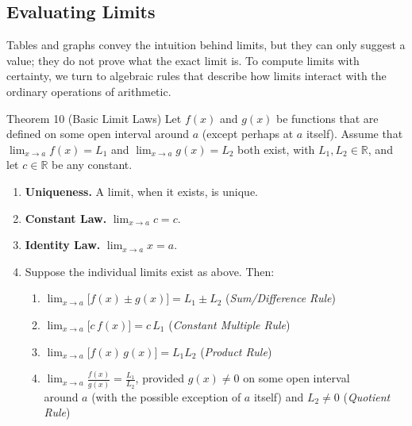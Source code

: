 \subsection*{Evaluating Limits}
\label{subsec:1.1.2}


Tables and graphs convey the intuition behind limits, but they can only suggest a value; they do not prove what the exact limit is.  To compute limits with certainty, we turn to algebraic rules that describe how limits interact with the ordinary operations of arithmetic.

\begin{theorembox}{Theorem 10 (Basic Limit Laws)}
Let \(f(x)\) and \(g(x)\) be functions that are defined on some open interval around \(a\) (except perhaps at \(a\) itself).  Assume that \(\displaystyle\lim_{x \to a} f(x) = L_{1}\) and \(\displaystyle\lim_{x \to a} g(x) = L_{2}\) both exist, with \(L_{1}, L_{2} \in \mathbb{R}\), and let \(c \in \mathbb{R}\) be any constant.

\begin{enumerate}
    \item \textbf{Uniqueness.} A limit, when it exists, is unique.

    \item \textbf{Constant Law.} \(\displaystyle\lim_{x \to a} c = c\).

    \item \textbf{Identity Law.} \(\displaystyle\lim_{x \to a} x = a\).

    \item Suppose the individual limits exist as above. Then:
    \begin{enumerate}
        \item[(a)] \(\displaystyle\lim_{x \to a} \bigl[f(x) \pm g(x)\bigr] = L_{1} \pm L_{2}\)
            \hfill (\textit{Sum/Difference Rule})

        \item[(b)] \(\displaystyle\lim_{x \to a} \bigl[c\,f(x)\bigr] = c\,L_{1}\)
            \hfill (\textit{Constant Multiple Rule})

        \item[(c)] \(\displaystyle\lim_{x \to a} \bigl[f(x)\,g(x)\bigr] = L_{1}L_{2}\)
            \hfill (\textit{Product Rule})

        \item[(d)] \(\displaystyle\lim_{x \to a} \frac{f(x)}{g(x)} = \frac{L_{1}}{L_{2}}\),
            provided \(g(x) \neq 0\) on some open interval \\ around \(a\) (with the possible exception  of \(a\) itself) and \(L_{2} \neq 0\)
            \hfill (\textit{Quotient Rule})


\end{enumerate}
\end{enumerate}
\end{theorembox}
